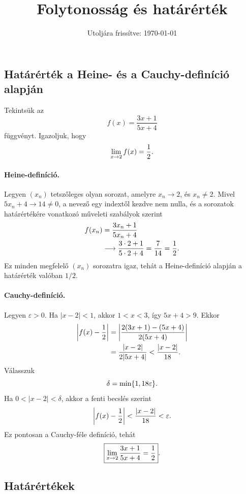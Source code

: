 \documentclass{szb-solution}
\title{Folytonosság és határérték}
\date{Utoljára frissítve: \today}
\begin{document}
\maketitle

\subsection{Határérték a Heine- és a Cauchy-definíció alapján}

Tekintsük az
$$
  f(x)=\frac{3x+1}{5x+4}
$$
függvényt. Igazoljuk, hogy
$$
  \lim_{x\to2}f(x)=\frac12
  \text.
$$

\paragraph{Heine-definíció.}
Legyen $(x_n)$ tetszőleges olyan sorozat, amelyre $x_n\to2$, és
$x_n\neq2$. Mivel $5x_n+4\to14\neq0$, a nevező egy indextől kezdve nem
nulla, és a sorozatok határértékére vonatkozó műveleti szabályok szerint
\begin{align*}
  f(x_n)&=\frac{3x_n+1}{5x_n+4}\\
  &\longrightarrow\frac{3\cdot2+1}{5\cdot2+4}
  =\frac7{14}=\frac12
  \text.
\end{align*}
Ez minden megfelelő $(x_n)$ sorozatra igaz, tehát a Heine-definíció alapján
a határérték valóban $1/2$.

\paragraph{Cauchy-definíció.}
Legyen $\varepsilon>0$. Ha $|x-2|<1$, akkor $1<x<3$, így
$5x+4>9$. Ekkor
\begin{align*}
  \left|f(x)-\frac12\right|
  &=\left|\frac{2(3x+1)-(5x+4)}{2(5x+4)}\right|\\
  &=\frac{|x-2|}{2|5x+4|}
  <\frac{|x-2|}{18}
  \text.
\end{align*}
Válasszuk
$$
  \delta=\min\{1,18\varepsilon\}
  \text.
$$
Ha $0<|x-2|<\delta$, akkor a fenti becslés szerint
$$
  \left|f(x)-\frac12\right|
  <\frac{|x-2|}{18}<\varepsilon
  \text.
$$
Ez pontosan a Cauchy-féle definíció, tehát
$$
  \boxed{\displaystyle\lim_{x\to2}\frac{3x+1}{5x+4}=\frac12}
  \text.
$$

\subsection{Határértékek}
\end{document}
